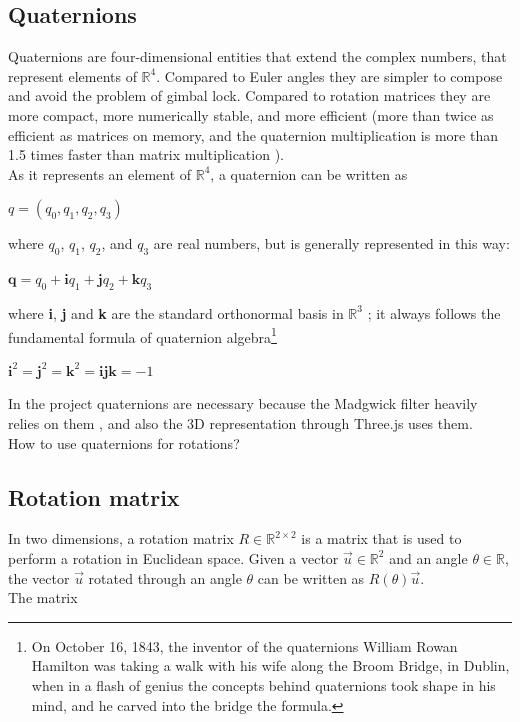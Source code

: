 \subsection{Quaternions}
Quaternions are four-dimensional entities that extend the complex numbers, that represent elements of $\mathbb{R}^4$. Compared to Euler angles they are simpler to compose and avoid the problem of gimbal lock. Compared to rotation matrices they are more compact, more numerically stable, and more efficient (more than twice as efficient as matrices on memory, and the quaternion multiplication is more than 1.5 times faster than matrix multiplication \cite{Gol10}).\\
As it represents an element of $\mathbb{R}^4$, a quaternion can be written as

\begin{center}
	$q = (q_0, q_1, q_2, q_3)$
\end{center}

where $q_0$, $q_1$, $q_2$, and $q_3$ are real numbers, but is generally represented in this way:

\begin{center}
	$\textbf{q} = q_0 + \textbf{i}q_1 + \textbf{j}q_2 + \textbf{k}q_3$
\end{center}

where \textbf{i}, \textbf{j} and \textbf{k} are the standard orthonormal basis in $\mathbb{R}^3$ \cite{Kui99}; it always follows the fundamental formula of quaternion algebra\footnote{On October 16, 1843, the inventor of the quaternions William Rowan Hamilton was taking a walk with his wife along the Broom Bridge, in Dublin, when in a flash of genius the concepts behind quaternions took shape in his mind, and he carved into the bridge the formula.}

\begin{center}
	$\textbf{i}^2 = \textbf{j}^2 = \textbf{k}^2 = \textbf{ijk} = -1$
\end{center}

In the project quaternions are necessary because the Madgwick filter heavily relies on them \cite{Mad10}, and also the 3D representation through Three.js uses them.\\
How to use quaternions for rotations?

\subsection{Rotation matrix}
In two dimensions, a rotation matrix $R \in \mathbb R^{2 \times 2}$ is a matrix that is used to perform a rotation in Euclidean space. Given a vector $\vec u \in \mathbb R^2$ and an angle $\theta \in \mathbb R$, the vector $\vec u$ rotated through an angle $\theta$ can be written as $R(\theta) \vec u$.\\
The matrix

